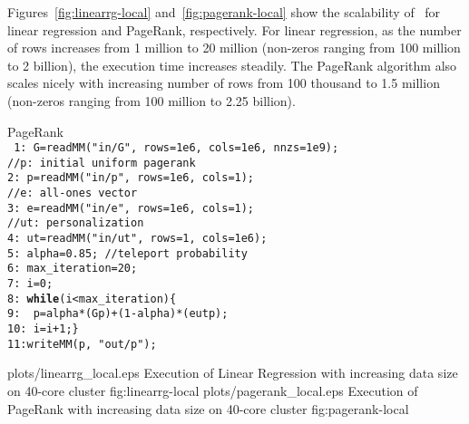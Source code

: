 Figures~\ref{fig:linearrg-local} and~\ref{fig:pagerank-local} show the scalability of \systemmltext\ for linear regression and PageRank, respectively. For linear regression, as the number of rows increases from 1 million to 20 million (non-zeros ranging from 100 million to 2 billion), the execution time increases steadily. The PageRank algorithm also scales nicely with increasing number of rows from 100 thousand to 1.5 million (non-zeros ranging from 100 million to 2.25 billion). 

\vspace{0.25cm}
\begin{script}\label{scpt:pagerank}
PageRank\\
\footnotesize
\texttt{
1:\ G=readMM("in/G", rows=1e6, cols=1e6, nnzs=1e9);\\
//p: initial uniform pagerank\\
2:\ p=readMM("in/p", rows=1e6, cols=1); \\
//e: all-ones vector  \\
3:\ e=readMM("in/e", rows=1e6, cols=1); \\
//ut: personalization \\
4:\ ut=readMM("in/ut", rows=1, cols=1e6); \\
5:\ alpha=0.85; //teleport probability \\
6:\ max\_iteration=20;\\
7:\ i=0;\\
8:\ \textbf{while}(i<max\_iteration)\{\\
9:\ \ p=alpha*(G\mmult p)+(1-alpha)*(e\mmult ut\mmult p);\\
10:\ i=i+1;\}\\
11:writeMM(p, "out/p");}
\end{script}
\vspace{0.25cm} 

\twosubfigures
{plots/linearrg_local.eps}
{Execution of Linear Regression with increasing data size on 40-core cluster}
{fig:linearrg-local}
{plots/pagerank_local.eps}
{Execution of PageRank with increasing data size on 40-core cluster}
{fig:pagerank-local}
{}
